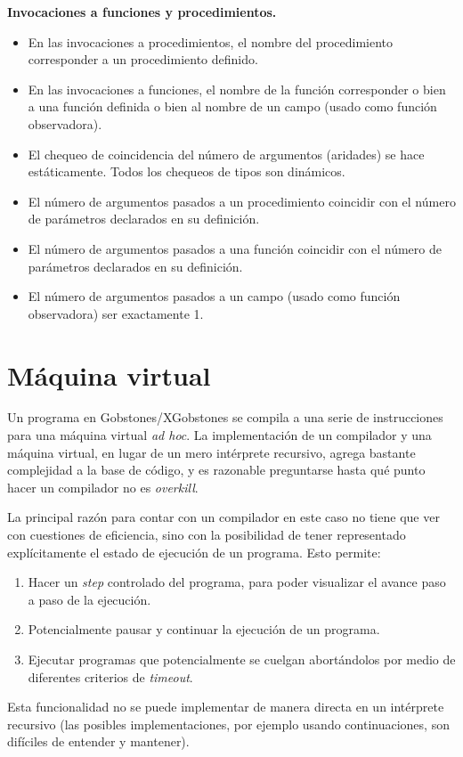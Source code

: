 \documentclass{article}
\begin{document}
{\bf Invocaciones a funciones y procedimientos.}
\begin{itemize}
\item En las invocaciones a procedimientos, el nombre del procedimiento \DEBE corresponder a un procedimiento definido.
\item En las invocaciones a funciones, el nombre de la funci\'on \DEBE corresponder
      o bien a una funci\'on definida o bien al nombre de un campo (usado como funci\'on observadora).
\item El chequeo de coincidencia del n\'umero de argumentos (aridades) se hace est\'aticamente.
      Todos los chequeos de tipos son din\'amicos.
\item El n\'umero de argumentos pasados a un procedimiento \DEBE coincidir con el n\'umero de par\'ametros declarados en su definici\'on.
\item El n\'umero de argumentos pasados a una funci\'on \DEBE coincidir con el n\'umero de par\'ametros declarados en su definici\'on.
\item El n\'umero de argumentos pasados a un campo (usado como funci\'on observadora) \DEBE ser exactamente 1.
\end{itemize}

\section{M\'aquina virtual}

Un programa en Gobstones/XGobstones se compila a una serie de instrucciones para una m\'aquina
virtual {\em ad hoc}. La implementaci\'on de un compilador y una m\'aquina virtual,
en lugar de un mero int\'erprete recursivo, agrega bastante complejidad a la base de c\'odigo,
y es razonable preguntarse hasta qu\'e punto hacer un compilador no es {\em overkill}.

La principal raz\'on para contar con un compilador en este caso no tiene que ver con cuestiones de
eficiencia, sino con la posibilidad de tener representado expl\'icitamente el estado de
ejecuci\'on de un programa.
Esto permite:
\begin{enumerate}
\item Hacer un {\em step} controlado del programa,
      para poder visualizar el avance paso a paso de la ejecuci\'on.
\item Potencialmente pausar y continuar la ejecuci\'on de un programa.
\item Ejecutar programas que potencialmente se cuelgan abort\'andolos por medio de diferentes
      criterios de {\em timeout}.
\end{enumerate}
Esta funcionalidad no se puede implementar de manera directa en un int\'erprete recursivo
(las posibles implementaciones, por ejemplo usando continuaciones, son
dif\'iciles de entender y mantener).
\end{document}
